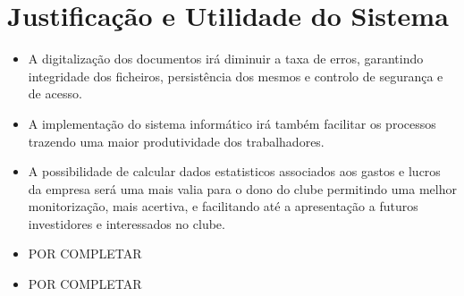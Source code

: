 \documentclass[a4paper,12pt]{scrreprt}
\begin{document}
\section{Justificação e Utilidade do Sistema}
\begin{itemize}
    \item A digitalização dos documentos irá diminuir a taxa de erros, garantindo integridade dos ficheiros, persistência dos mesmos e controlo de segurança e de acesso.
    \item A implementação do sistema informático irá também facilitar os processos trazendo uma maior produtividade dos trabalhadores.
    \item A possibilidade de calcular dados estatisticos associados aos gastos e lucros da empresa será uma mais valia para o dono do clube permitindo uma melhor monitorização, mais acertiva, e facilitando até a apresentação a futuros investidores e interessados no clube.
    \item POR COMPLETAR
    \item POR COMPLETAR
\end{itemize}

\end{document}
